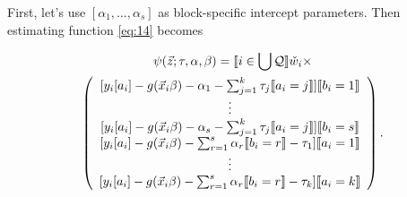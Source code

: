 \documentclass{article}
\DeclarePairedDelimiter{\indicator}{\llbracket}{\rrbracket}
\newcommand{\owt}[1][{[a_i]}]{\ensuremath{\check{w}_{i#1}}}
\begin{document}
First, let's use $[\alpha_{1}, \ldots, \alpha_{s}]$
as block-specific intercept parameters. Then 
estimating function \eqref{eq:14} becomes

\begin{multline}
  \label{eq:9}
  \psi(\vec{z}; \tau, \alpha, \beta) =
  \indicator{i \in \bigcup \mathcal{Q}} \owt[]\times \\  
  \left(
    \begin{array}{c}
           [y_{i}[a_{i}] - g(\vec{x}_{i}\beta)-
                  \alpha_{1} -
      \sum_{j=1}^{k}\tau_{j}\indicator{a_{i}=j}]\indicator{b_{i}=1}\\
      \vdots\\ 
          {} [y_{i}[a_{i}] - g(\vec{x}_{i}\beta)-
                  \alpha_{s} -
      \sum_{j=1}^{k}\tau_{j}\indicator{a_{i}=j}]\indicator{b_{i}=s}\\      
         {}  [y_{i}[a_{i}] - g(\vec{x}_{i}\beta)-
                  \sum_{r=1}^s\alpha_r\indicator{b_i=r}-\tau_{1}]\indicator{a_{i}=1}\\
                  \vdots \\
          {} [y_{i}[a_{i}] - g(\vec{x}_{i}\beta)-
                 \sum_{r=1}^s\alpha_r\indicator{b_i=r} - \tau_{k}]\indicator{a_{i}=k}\\
    \end{array}
\right).
\end{multline}
\end{document}
